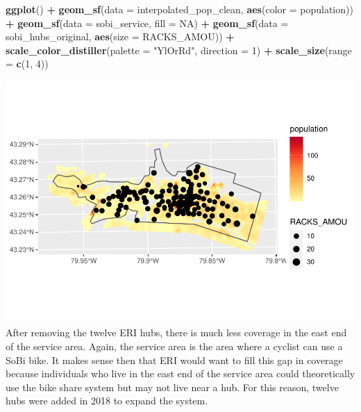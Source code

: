 \documentclass[
]{article}
\newenvironment{Shaded}{\begin{snugshade}}{\end{snugshade}}
\newcommand{\DataTypeTok}[1]{\textcolor[rgb]{0.13,0.29,0.53}{#1}}
\newcommand{\DecValTok}[1]{\textcolor[rgb]{0.00,0.00,0.81}{#1}}
\newcommand{\KeywordTok}[1]{\textcolor[rgb]{0.13,0.29,0.53}{\textbf{#1}}}
\newcommand{\NormalTok}[1]{#1}
\newcommand{\OperatorTok}[1]{\textcolor[rgb]{0.81,0.36,0.00}{\textbf{#1}}}
\newcommand{\OtherTok}[1]{\textcolor[rgb]{0.56,0.35,0.01}{#1}}
\newcommand{\StringTok}[1]{\textcolor[rgb]{0.31,0.60,0.02}{#1}}
\begin{document}
\begin{Shaded}
\begin{Highlighting}[]
\KeywordTok{ggplot}\NormalTok{() }\OperatorTok{+}\StringTok{ }
\StringTok{  }\KeywordTok{geom_sf}\NormalTok{(}\DataTypeTok{data =}\NormalTok{ interpolated_pop_clean,}
          \KeywordTok{aes}\NormalTok{(}\DataTypeTok{color =}\NormalTok{ population)) }\OperatorTok{+}
\StringTok{  }\KeywordTok{geom_sf}\NormalTok{(}\DataTypeTok{data =}\NormalTok{ sobi_service,}
          \DataTypeTok{fill =} \OtherTok{NA}\NormalTok{) }\OperatorTok{+}
\StringTok{  }\KeywordTok{geom_sf}\NormalTok{(}\DataTypeTok{data =}\NormalTok{ sobi_hubs_original,}
          \KeywordTok{aes}\NormalTok{(}\DataTypeTok{size =}\NormalTok{ RACKS_AMOU)) }\OperatorTok{+}
\StringTok{  }\KeywordTok{scale_color_distiller}\NormalTok{(}\DataTypeTok{palette =} \StringTok{"YlOrRd"}\NormalTok{, }
                        \DataTypeTok{direction =} \DecValTok{1}\NormalTok{) }\OperatorTok{+}
\StringTok{  }\KeywordTok{scale_size}\NormalTok{(}\DataTypeTok{range =} \KeywordTok{c}\NormalTok{(}\DecValTok{1}\NormalTok{, }\DecValTok{4}\NormalTok{))}
\end{Highlighting}
\end{Shaded}

\includegraphics{00-Data-Processing-Example_files/figure-latex/unnamed-chunk-91-1.pdf}
After removing the twelve ERI hubs, there is much less coverage in the
east end of the service area. Again, the service area is the area where
a cyclist can use a SoBi bike. It makes sense then that ERI would want
to fill this gap in coverage because individuals who live in the east
end of the service area could theoretically use the bike share system
but may not live near a hub. For this reason, twelve hubs were added in
2018 to expand the system.
\end{document}
